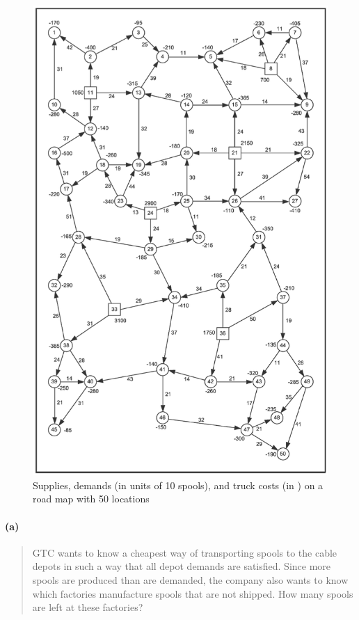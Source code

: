 \begin{figure}[H]
	\centering
	\includegraphics[scale=1]{./img/figure3-13.png}
	\caption{Supplies, demands (in units of 10 spools), and truck costs (in \texteuro) on a road map with 50 locations}
	\label{network3-1}
\end{figure}

\paragraph{(a)}
\begin{quote}
GTC wants to know a cheapest way of transporting spools to the cable depots in such a way that all depot demands are satisfied.
Since more spools are produced than are demanded, the company also wants to know which factories manufacture spools that are not shipped. How many spools are left at these factories?
\end{quote}

